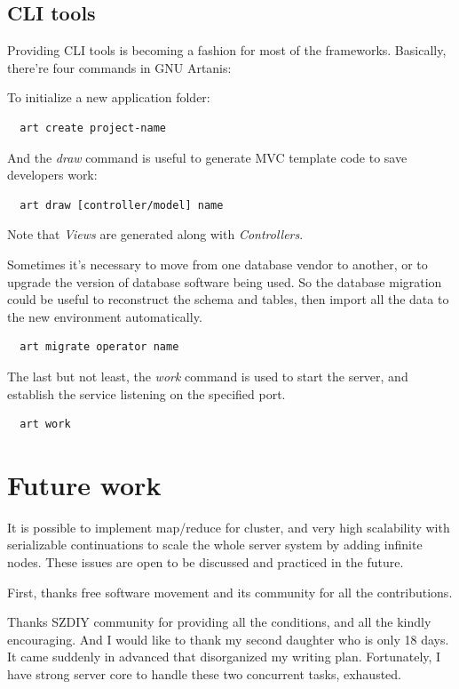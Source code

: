 \documentclass[numbers,numberedpars]{sigplanconf}
\begin{document}
\subsection{CLI tools} \label{CLI tools}

Providing CLI tools is becoming a fashion for most of the frameworks.
Basically, there're four commands in GNU Artanis:

To initialize a new application folder:
\begin{lstlisting}
  art create project-name
\end{lstlisting}

And the {\it draw} command is useful to generate MVC template code to save developers work:
\begin{lstlisting}
  art draw [controller/model] name
\end{lstlisting}
Note that {\it Views} are generated along with {\it Controllers}.

Sometimes it's necessary to move from one database vendor to another, or to upgrade the version of database software being used.
So the database migration could be useful to reconstruct the schema and tables, then import all the data to the new environment automatically.
\begin{lstlisting}
  art migrate operator name
\end{lstlisting}

The last but not least, the {\it work} command is used to start the server, and establish the service listening on the specified port.
\begin{lstlisting}
  art work
\end{lstlisting}

\section{Future work}

It is possible to implement map/reduce for cluster, and very high scalability with serializable continuations to scale the whole server
system by adding infinite nodes. These issues are open to be discussed and practiced in the future.

\acks

First, thanks free software movement and its community for all the contributions.

Thanks SZDIY community for providing all the conditions, and all the kindly encouraging. And I would like to thank my second daughter who
is only 18 days. It came suddenly in advanced that disorganized my writing plan. Fortunately, I have strong server core to handle these two
concurrent tasks, exhausted.





\softraggedright


\end{document}
